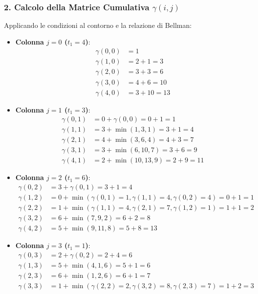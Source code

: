 \subsubsection{2. Calcolo della Matrice Cumulativa $\gamma(i,j)$}
Applicando le condizioni al contorno e la relazione di Bellman:
\begin{itemize}
    \item \textbf{Colonna $j=0$ ($t_1=4$)}:
    \begin{align*}
    \gamma(0,0) &= 1 \\
    \gamma(1,0) &= 2 + 1 = 3 \\
    \gamma(2,0) &= 3 + 3 = 6 \\
    \gamma(3,0) &= 4 + 6 = 10 \\
    \gamma(4,0) &= 3 + 10 = 13
    \end{align*}
    \item \textbf{Colonna $j=1$ ($t_1=3$)}:
    \begin{align*}
    \gamma(0,1) &= 0 + \gamma(0,0) = 0 + 1 = 1 \\
    \gamma(1,1) &= 3 + \min(1, 3, 1) = 3 + 1 = 4 \\
    \gamma(2,1) &= 4 + \min(3, 6, 4) = 4 + 3 = 7 \\
    \gamma(3,1) &= 3 + \min(6, 10, 7) = 3 + 6 = 9 \\
    \gamma(4,1) &= 2 + \min(10, 13, 9) = 2 + 9 = 11
    \end{align*}
    \item \textbf{Colonna $j=2$ ($t_1=6$)}:
    \begin{align*}
    \gamma(0,2) &= 3 + \gamma(0,1) = 3 + 1 = 4 \\
    \gamma(1,2) &= 0 + \min(\gamma(0,1)=1, \gamma(1,1)=4, \gamma(0,2)=4) = 0 + 1 = 1 \\
    \gamma(2,2) &= 1 + \min(\gamma(1,1)=4, \gamma(2,1)=7, \gamma(1,2)=1) = 1 + 1 = 2 \\
    \gamma(3,2) &= 6 + \min(7, 9, 2) = 6 + 2 = 8 \\
    \gamma(4,2) &= 5 + \min(9, 11, 8) = 5 + 8 = 13
    \end{align*}
    \item \textbf{Colonna $j=3$ ($t_1=1$)}:
    \begin{align*}
    \gamma(0,3) &= 2 + \gamma(0,2) = 2 + 4 = 6 \\
    \gamma(1,3) &= 5 + \min(4, 1, 6) = 5 + 1 = 6 \\
    \gamma(2,3) &= 6 + \min(1, 2, 6) = 6 + 1 = 7 \\
    \gamma(3,3) &= 1 + \min(\gamma(2,2)=2, \gamma(3,2)=8, \gamma(2,3)=7) = 1 + 2 = 3 \\

\end{align*}
\end{itemize}
